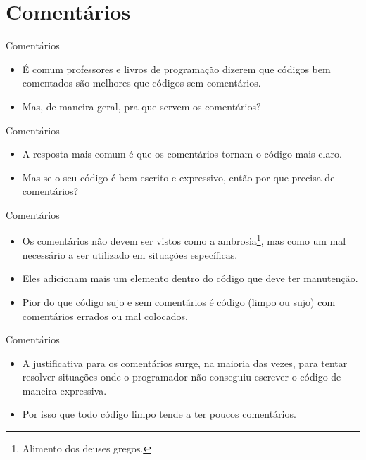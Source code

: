 \documentclass[11pt]{beamer}
\begin{document}
  \section{Comentários}

  \begin{frame}{Comentários}
    \begin{itemize}
      \item É comum professores e livros de programação dizerem que códigos bem comentados são melhores que códigos sem comentários.
      \item Mas, de maneira geral, pra que servem os comentários?
    \end{itemize}
  \end{frame}

  \begin{frame}{Comentários}
    \begin{itemize}
      \item A resposta mais comum é que os comentários tornam o código mais claro.
      \item Mas se o seu código é bem escrito e expressivo, então por que precisa de comentários?
    \end{itemize}
  \end{frame}


  \begin{frame}{Comentários}
    \begin{itemize}
      \item Os comentários não devem ser vistos como a ambrosia\footnote{Alimento dos deuses gregos.}, mas como um mal necessário a ser utilizado em situações específicas.
      \item Eles adicionam mais um elemento dentro do código que deve ter manutenção.
      \item Pior do que código sujo e sem comentários é código (limpo ou sujo) com comentários errados ou mal colocados. 
    \end{itemize}
  \end{frame}

  \begin{frame}{Comentários}
    \begin{itemize}
      \item A justificativa para os comentários surge, na maioria das vezes, para tentar resolver situações onde o programador não conseguiu escrever o código de maneira expressiva.
      \item Por isso que todo código limpo tende a ter poucos comentários. 
    \end{itemize}
  \end{frame}
\end{document}

